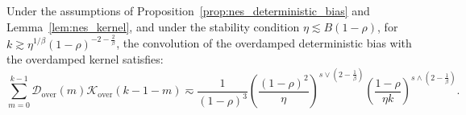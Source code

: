 \begin{lemma}
\label{lem:nes_conv_over_over}
Under the assumptions of Proposition~\ref{prop:nes_deterministic_bias} and Lemma~\ref{lem:nes_kernel}, and under the stability condition $\eta\lesssim B(1-\rho)$, for $k \gtrsim \eta^{1/\beta}(1-\rho)^{-2-\frac{2}{\beta}}$, the convolution of the overdamped deterministic bias with the overdamped kernel satisfies:
\begin{equation*}
    \sum_{m=0}^{k-1} \mathcal{D}_{\mathrm{over}}(m) \mathcal{K}_{\mathrm{over}}(k-1-m) \eqsim \frac{1}{(1-\rho)^3} \left(\frac{(1-\rho)^2}{\eta}\right)^{s \vee \left(2-\frac{1}{\beta}\right)} \left(\frac{1-\rho}{\eta k}\right)^{s \wedge \left(2-\frac{1}{\beta}\right)}.
\end{equation*}
\end{lemma}
